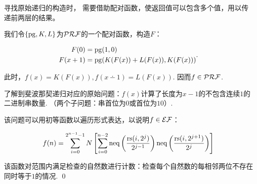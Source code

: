 \label{1.13}
\begin{pf} \rm 

寻找原始递归的构造时，
需要借助配对函数，使返回值可以包含多个值，用以传递前两层的结果。

我们令$\{\mathrm{pg}, K, L\}$为$\mathcal{PRF}$的一个配对函数，构造$F$：

$$
\begin{aligned}
    F(0)&=\mathrm{pg}(1, 0) \\
    F(x+1)&= \mathrm{pg}(K(F(x))+L(F(x)), K(F(x)))\\
\end{aligned}.
$$

此时，$f(x) = K(F(x)), f(x\dotminus 1) = L(F(x))$. 因而$f\in\mathcal{PRF}$.

了解到斐波那契递归对应的原始问题：$f(x)$计算了长度为$x-1$的不包含连续$1$的二进制串数量. （两个子问题：串首位为$0$或首位为$10$）.

该问题可以用初等函数以遍历形式表达，以说明$f\in\mathcal{EF}$：

$$
f(n) = \sum_{i=0}^{2^{n-1}-1}N\left[ \sum_{i=0}^{n-2} \mathrm{neq}\left(\frac{\mathrm{rs}(i,2^j)}{2^{j-1}}\right) 
\mathrm{neq}\left(\frac{\mathrm{rs}(i,2^{j+1})}{2^{j}}\right)
\right]
$$

该函数对范围内满足检查的自然数进行计数：检查每个自然数的每相邻两位不存在同时等于$1$的情况.
    \qed
\end{pf}
